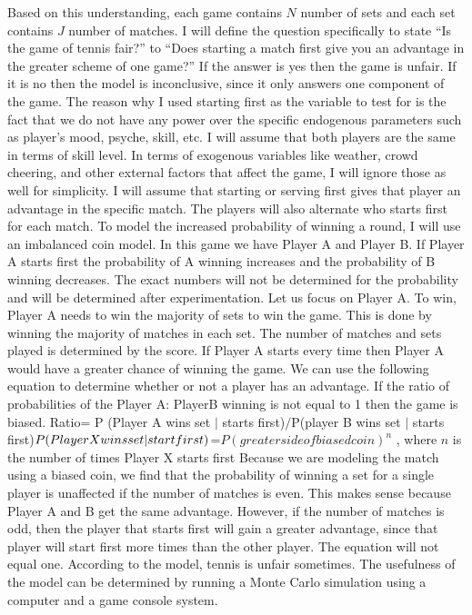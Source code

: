 \documentclass[12pt]{article}
\begin{document}
Based on this understanding, each game contains $N$ number of sets and each set contains $J$ number of matches.  I will define the question specifically to state “Is the game of tennis fair?” to “Does starting a match first give you an advantage in the greater scheme of one game?” If the answer is yes then the game is unfair. If it is no then the model is inconclusive, since it only answers one component of the game. The reason why I used starting first as the variable to test for is the fact that we do not have any power over the specific endogenous parameters such as player’s mood, psyche, skill, etc. I will assume that both players are the same in terms of skill level. In terms of exogenous variables like weather, crowd cheering, and other external factors that affect the game, I will ignore those as well for simplicity. 
\newline
I will assume that starting or serving first gives that player an advantage in the specific match. The players will also alternate who starts first for each match. To model the increased probability of winning a round, I will use an imbalanced coin model. In this game we have Player A and Player B. If Player A starts first the probability of A winning increases and the probability of B winning decreases. The exact numbers will not be determined for the probability and will be determined after experimentation. 
\newline
Let us focus on Player A. To win, Player A needs to win the majority of sets to win the game. This is done by winning the majority of matches in each set. The number of matches and sets played is determined by the score. If Player A starts every time then Player A would have a greater chance of winning the game. We can use the following equation to determine whether or not a player has an advantage. If the ratio of probabilities of the Player A:  PlayerB winning is not equal to 1 then the game is biased. 
\newline
 Ratio= P (Player A wins set $|$ starts first)$/$P(player B wins set $|$ starts first)$
\newline
 P(Player X wins  set | start first)$=$ P(greater side of biased coin)^n$ , where $n$ is the number of times Player X starts first\newline
\newline
Because we are modeling the match using a biased coin, we find that the probability of winning a set for a single player is unaffected if the number of matches is even. This makes sense because Player A and B get the same advantage. However, if the number of matches is odd, then the player that starts first will gain a greater advantage, since that player will start first more times than the other player. The equation will not equal one. \newline
\newline
According to the model, tennis is unfair sometimes. The usefulness of the model can be determined by running a Monte Carlo simulation using a computer and a game console system. 
\end{document}
